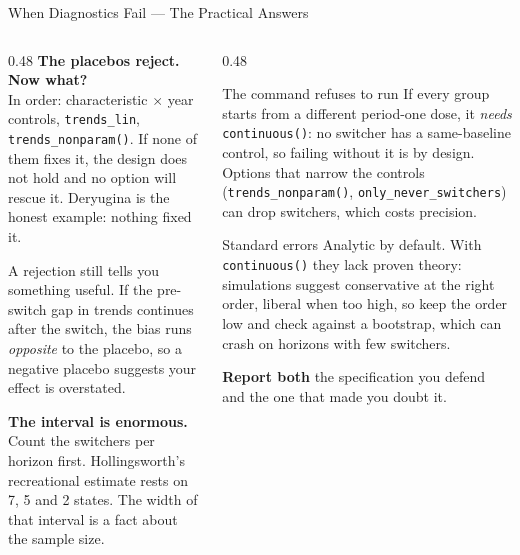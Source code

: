 \documentclass[main.tex]{subfiles}
\begin{document}
\begin{frame}{When Diagnostics Fail --- The Practical Answers}

  \begin{columns}[T]
    \begin{column}{0.48\textwidth}
      \textbf{The placebos reject. Now what?}\\
      \footnotesize In order: characteristic $\times$ year controls,
      \texttt{trends\_lin}, \texttt{trends\_nonparam()}. If none of them fixes
      it, the design does not hold and no option will rescue it. Deryugina is
      the honest example: nothing fixed it.

      \smallskip
      A rejection still tells you something useful. If the pre-switch gap in
      trends continues after the switch, the bias runs \emph{opposite} to the
      placebo, so a negative placebo suggests your effect is overstated.

      \medskip
      \normalsize\textbf{The interval is enormous.}\\
      \footnotesize Count the switchers per horizon first. Hollingsworth's
      recreational estimate rests on 7, 5 and 2 states. The width of that
      interval is a fact about the sample size.
    \end{column}
    \begin{column}{0.48\textwidth}
      \begin{block}{\footnotesize The command refuses to run}
        \footnotesize
        If every group starts from a different period-one dose, it
        \emph{needs} \texttt{continuous()}: no switcher has a same-baseline
        control, so failing without it is by design. Options that narrow the
        controls (\texttt{trends\_nonparam()}, \texttt{only\_never\_switchers})
        can drop switchers, which costs precision.
      \end{block}

      \smallskip
      \begin{alertblock}{\footnotesize Standard errors}
        \footnotesize
        Analytic by default. With \texttt{continuous()} they lack proven
        theory: simulations suggest conservative at the right order, liberal
        when too high, so keep the order low and check against a bootstrap,
        which can crash on horizons with few switchers.
      \end{alertblock}

      \smallskip
      \footnotesize \textbf{Report both} the specification you defend and the one
      that made you doubt it.
    \end{column}
  \end{columns}

\end{frame}
\end{document}
